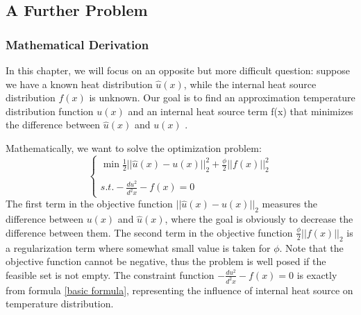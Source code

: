 \documentclass{article}
\begin{document}
    \subsection{A Further Problem}
    \subsubsection{Mathematical Derivation}
    In this chapter, we will focus on an opposite but more difficult question: suppose we have a known heat distribution $\hat{u}(x)$, while the internal heat source distribution $f(x)$ is unknown. Our goal is to find an approximation temperature distribution function \( u(x) \) and an internal heat source term f(x) that minimizes the difference between \( \hat{u}(x) \) and \( u(x) \) .

Mathematically, we want to solve the optimization problem:
\begin{equation}
\begin{cases}
    \min \frac{1}{2}||\hat{u}(x)-u(x)||^2_{2}+\frac{\phi}{2}||f(x)||^2_{2}\\
    \\
    s.t. -\frac{du^2}{d^2 x} - f(x) = 0 \label{convex basic} 
\end{cases}
\end{equation}
 The first term in the objective function $||\hat{u}(x)-u(x)||_2$ measures the diﬀerence between $u(x)$ and $\hat{u}(x)$, where the goal is obviously to decrease the difference between them. The second term in the objective function $\frac{\phi}{2}||f(x)||_2$ is a regularization term where somewhat small value is taken for $\phi$. Note that the objective function cannot be negative, thus the problem is well posed if the feasible set is not empty. The constraint function $ -\frac{du^2}{d^2 x} - f(x) = 0 $ is exactly from formula \ref{basic formula}, representing the influence of internal heat source on temperature distribution.
\end{document}
